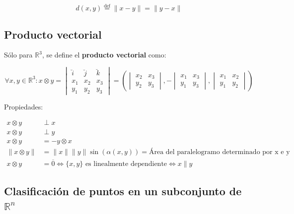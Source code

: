 \documentclass{article}
\renewcommand{\Bbb}{\mathbb}
\begin{document}
\begin{equation}
d(x,y) \overset{\text{def}}{=} \| x - y \| = \| y - x \|
\end{equation}

\subsection{Producto vectorial}

Sólo para $\Bbb R^3$, se define el \textbf{producto vectorial} como:

\begin{equation}
\forall x, y \in \Bbb R^3: x \otimes y = \begin{vmatrix}
    \breve{i} & \breve{j} & \breve{k} \\
    x_1 & x_2 & x_3 \\ 
    y_1 & y_2 & y_3
  \end{vmatrix} =
\left(
  \begin{vmatrix} x_2 & x_3 \\ y_2 & y_3 \end{vmatrix},
  -\begin{vmatrix} x_1 & x_3 \\ y_1 & y_3 \end{vmatrix},
  \begin{vmatrix} x_1 & x_2 \\ y_1 & y_2 \end{vmatrix}
\right)
\end{equation}

Propiedades:

\begin{subequations}
\begin{align}
x \otimes y & \perp x \\
x \otimes y & \perp y \\
x \otimes y & = -y \otimes x \\
\| x \otimes y \| & = \|x\| \|y\| \sin(\alpha(x,y)) = \text{Área del paralelogramo determinado por x e y} \\
x \otimes y & = \overline{0} \Longleftrightarrow \{x, y\} \text{ es linealmente dependiente} \Longleftrightarrow x \parallel y
\end{align}
\end{subequations}

\subsection{Clasificación de puntos en un subconjunto de \texorpdfstring{$\Bbb R^n$}{Rn}}
\end{document}
